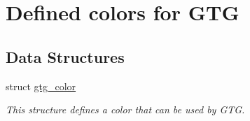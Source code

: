 \hypertarget{group__GTGColor}{\section{Defined colors for G\-T\-G}
\label{group__GTGColor}
}
\subsection*{Data Structures}
\begin{DoxyCompactItemize}
\item 
struct \hyperlink{structgtg__color}{gtg\-\_\-color}
\begin{DoxyCompactList}\small\item\em This structure defines a color that can be used by G\-T\-G. \end{DoxyCompactList}\end{DoxyCompactItemize}

